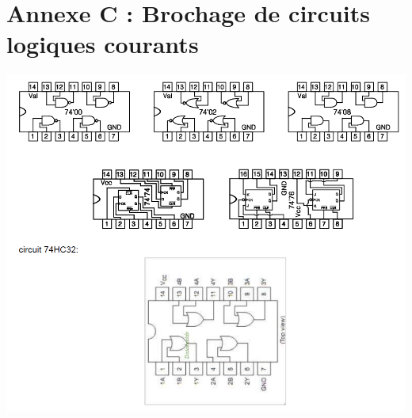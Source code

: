 \section*{Annexe C : Brochage de circuits logiques courants}
\vspace{-0.1cm}
\label{ANNEXE C}
\begin{center}
\includegraphics[scale=0.8]{Labo3_AnnexeC.png}
\end{center}

\endinput
